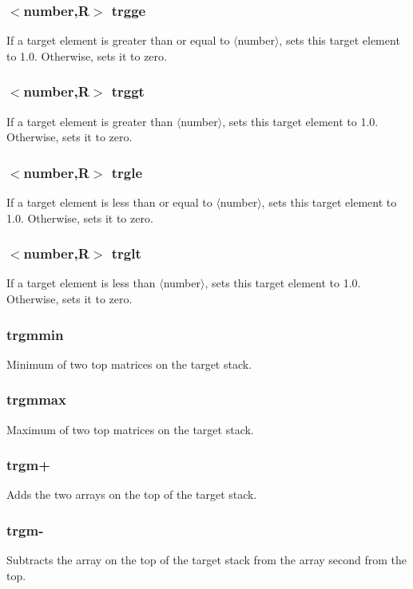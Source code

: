 \documentclass[a4paper,10pt]{report}
\begin{document}
\subsubsection{$<$number,{\bf R}$>$ trgge}\label{sec:trgge}
If a target element is greater than or equal to $\langle$number$\rangle$, sets this target element to 1.0.
Otherwise, sets it to zero.

\subsubsection{$<$number,{\bf R}$>$ trggt}\label{sec:trggt}
If a target element is greater than $\langle$number$\rangle$, sets this target element to 1.0.
Otherwise, sets it to zero.

\subsubsection{$<$number,{\bf R}$>$ trgle}\label{sec:trgle}
If a target element is less than or equal to $\langle$number$\rangle$, sets this target element to 1.0.
Otherwise, sets it to zero.

\subsubsection{$<$number,{\bf R}$>$ trglt}\label{sec:trglt}
If a target element is less than $\langle$number$\rangle$, sets this target element to 1.0.
Otherwise, sets it to zero.

\subsubsection{trgmmin}\label{sec:trgmmin}
Minimum of two top matrices on the target stack.

\subsubsection{trgmmax}\label{sec:trgmmax}
Maximum of two top matrices on the target stack.

\subsubsection{trgm+}\label{sec:trgm+}
Adds the two arrays on the top of the target stack.

\subsubsection{trgm-}\label{sec:trgm-}
Subtracts the array on the top of the target stack from the array second from
the top.
\end{document}
